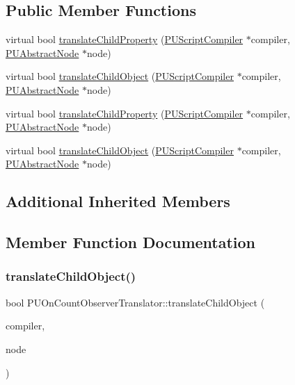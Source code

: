 \subsection*{Public Member Functions}
\begin{DoxyCompactItemize}
\item 
virtual bool \hyperlink{classPUOnCountObserverTranslator_a3a06ba8121fb86bde161a19a3f9e1019}{translate\+Child\+Property} (\hyperlink{classPUScriptCompiler}{P\+U\+Script\+Compiler} $\ast$compiler, \hyperlink{classPUAbstractNode}{P\+U\+Abstract\+Node} $\ast$node)
\item 
virtual bool \hyperlink{classPUOnCountObserverTranslator_a63459b911b62dc37931ea5365665999a}{translate\+Child\+Object} (\hyperlink{classPUScriptCompiler}{P\+U\+Script\+Compiler} $\ast$compiler, \hyperlink{classPUAbstractNode}{P\+U\+Abstract\+Node} $\ast$node)
\item 
virtual bool \hyperlink{classPUOnCountObserverTranslator_a027b90626255c0d5fa639d6abe5cbd56}{translate\+Child\+Property} (\hyperlink{classPUScriptCompiler}{P\+U\+Script\+Compiler} $\ast$compiler, \hyperlink{classPUAbstractNode}{P\+U\+Abstract\+Node} $\ast$node)
\item 
virtual bool \hyperlink{classPUOnCountObserverTranslator_a3f28075139fc0df9a4a68503521d81fe}{translate\+Child\+Object} (\hyperlink{classPUScriptCompiler}{P\+U\+Script\+Compiler} $\ast$compiler, \hyperlink{classPUAbstractNode}{P\+U\+Abstract\+Node} $\ast$node)
\end{DoxyCompactItemize}
\subsection*{Additional Inherited Members}


\subsection{Member Function Documentation}
\mbox{\label{classPUOnCountObserverTranslator_a63459b911b62dc37931ea5365665999a}} 
\subsubsection{\texorpdfstring{translate\+Child\+Object()}{translateChildObject()}\hspace{0.1cm}{\footnotesize\ttfamily [1/2]}}
{\footnotesize\ttfamily bool P\+U\+On\+Count\+Observer\+Translator\+::translate\+Child\+Object (\begin{DoxyParamCaption}\item[{\hyperlink{classPUScriptCompiler}{P\+U\+Script\+Compiler} $\ast$}]{compiler,  }\item[{\hyperlink{classPUAbstractNode}{P\+U\+Abstract\+Node} $\ast$}]{node }\end{DoxyParamCaption})\hspace{0.3cm}{\ttfamily [virtual]}}

